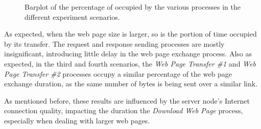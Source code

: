\begin{figure}[ht]
	\noindent{}
	\caption{\label{fig:perctime} Barplot of the percentage of occupied by the various processes in the different experiment scenarios.}
\end{figure}

As expected, when the web page size is larger, so is the portion of time occupied by its transfer. The request and response sending processes are mostly insignificant, introducing little delay in the web page exchange process. Also as expected, in the third and fourth scenarios, the \textit{Web Page Transfer \#1} and \textit{Web Page Transfer \#2} processes occupy a similar percentage of the web page exchange duration, as the same number of bytes is being sent over a similar link.

As mentioned before, these results are influenced by the server node's Internet connection quality, impacting the duration the \textit{Download Web Page} process, especially when dealing with larger web pages.




